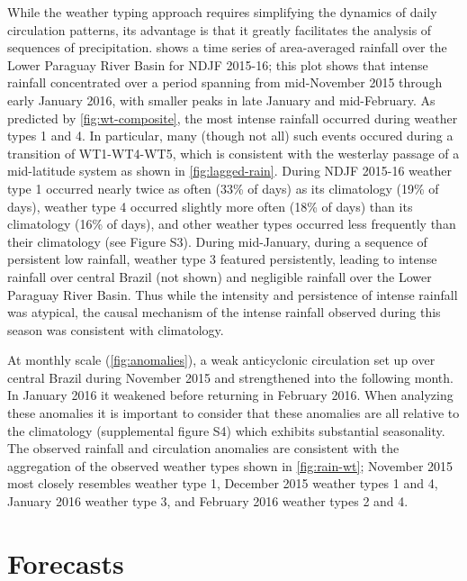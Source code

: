 \documentclass[twocol]{ametsoc}
\begin{document}
While the weather typing approach requires simplifying the dynamics of daily circulation patterns, its advantage is that it greatly facilitates the analysis of sequences of precipitation.
 shows a time series of area-averaged rainfall over the Lower Paraguay River Basin for NDJF 2015-16; this plot shows that intense rainfall concentrated over a period spanning from mid-November 2015 through early January 2016, with smaller peaks in late January and mid-February.
As predicted by \cref{fig:wt-composite}, the most intense rainfall occurred during weather types 1 and 4.
In particular, many (though not all) such events occured during a transition of WT1-WT4-WT5, which is consistent with the westerlay passage of a mid-latitude system as shown in \cref{fig:lagged-rain}.
During NDJF 2015-16 weather type 1 occurred nearly twice as often (33\% of days) as its climatology (19\% of days), weather type 4 occurred slightly more often (18\% of days) than its climatology (16\% of days), and other weather types occurred less frequently than their climatology (see Figure S3).
During mid-January, during a sequence of persistent low rainfall, weather type 3 featured persistently, leading to intense rainfall over central Brazil (not shown) and negligible rainfall over the Lower Paraguay River Basin.
Thus while the intensity and persistence of intense rainfall was atypical, the causal mechanism of the intense rainfall observed during this season was consistent with climatology.

At monthly scale (\cref{fig:anomalies}), a weak anticyclonic circulation set up over central Brazil during November 2015 and strengthened into the following month.
In January 2016 it weakened before returning in February 2016.
When analyzing these anomalies it is important to consider that these anomalies are all relative to the climatology (supplemental figure S4) which exhibits substantial seasonality.
The observed rainfall and circulation anomalies are consistent with the aggregation of the observed weather types shown in \cref{fig:rain-wt}; November 2015 most closely resembles weather type 1, December 2015 weather types 1 and 4, January 2016 weather type
3, and February 2016 weather types 2 and 4.



\section{Forecasts} \label{sec:fcsts}
\end{document}

